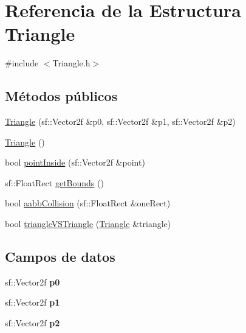 \hypertarget{structTriangle}{}\section{Referencia de la Estructura Triangle}
\label{structTriangle}


{\ttfamily \#include $<$Triangle.\+h$>$}

\subsection*{Métodos públicos}
\begin{DoxyCompactItemize}
\item 
\hyperlink{structTriangle_adfb983e02cc6901f9cf28c81036f8dce}{Triangle} (sf\+::\+Vector2f \&p0, sf\+::\+Vector2f \&p1, sf\+::\+Vector2f \&p2)
\item 
\hyperlink{structTriangle_aaefe4ed500c07918d30c6f0e286332c5}{Triangle} ()
\item 
bool \hyperlink{structTriangle_a6e233369dff883d425b1077c4eb1fb39}{point\+Inside} (sf\+::\+Vector2f \&point)
\item 
sf\+::\+Float\+Rect \hyperlink{structTriangle_ad65472004d16c530d7a55713f7e9cf29}{get\+Bounds} ()
\item 
bool \hyperlink{structTriangle_a8329a43d14d395c4cf7beb79014a5300}{aabb\+Collision} (sf\+::\+Float\+Rect \&one\+Rect)
\item 
bool \hyperlink{structTriangle_ab4526a1cd59654ac9018c445ccbc0080}{triangle\+V\+S\+Triangle} (\hyperlink{structTriangle}{Triangle} \&triangle)
\end{DoxyCompactItemize}
\subsection*{Campos de datos}
\begin{DoxyCompactItemize}
\item 
\hypertarget{structTriangle_a329348e606ae7d13277e4990ab636054}{}sf\+::\+Vector2f {\bfseries p0}\label{structTriangle_a329348e606ae7d13277e4990ab636054}

\item 
\hypertarget{structTriangle_adb0caecb15df48f0d5bcfe3000ed9ee3}{}sf\+::\+Vector2f {\bfseries p1}\label{structTriangle_adb0caecb15df48f0d5bcfe3000ed9ee3}

\item 
\hypertarget{structTriangle_af1832d337761d4949cabaff62e9b7711}{}sf\+::\+Vector2f {\bfseries p2}\label{structTriangle_af1832d337761d4949cabaff62e9b7711}

\end{DoxyCompactItemize}


